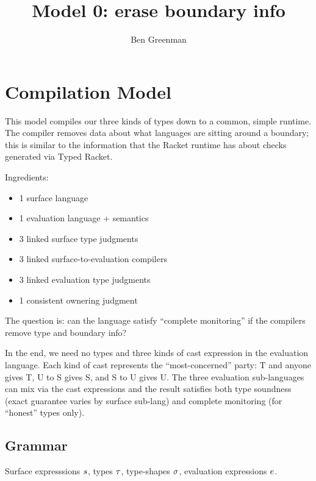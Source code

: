\documentclass[nonacm,10pt]{acmart}
\title{Model 0: erase boundary info}
\author{Ben Greenman}
\begin{document}
\maketitle


\section{Compilation Model}

This model compiles our three kinds of types down to a common, simple runtime.
The compiler removes data about what languages are sitting around a boundary;
 this is similar to the information that the Racket runtime has about checks
 generated via Typed Racket.

Ingredients:

\begin{itemize}
\item 1 surface language
\item 1 evaluation language + semantics
\item 3 linked surface type judgments
\item 3 linked surface-to-evaluation compilers
\item 3 linked evaluation type judgments
\item 1 consistent ownering judgment
\end{itemize}

The question is: can the language satisfy ``complete monitoring''
 if the compilers remove type and boundary info?

In the end, we need no types and three kinds of cast expression in the
 evaluation language.
Each kind of cast represents the ``most-concerned'' party:
 T and anyone gives T, U to S gives S, and S to U gives U.
The three evaluation sub-languages can mix via the cast expressions and the
 result satisfies both type soundness (exact guarantee varies by surface sub-lang)
 and complete monitoring (for ``honest'' types only).


\subsection{Grammar}

Surface expresssions $s$,
 types $\tau$,
 type-shapes $\sigma$,
 evaluation expressions $e$.
\end{document}
